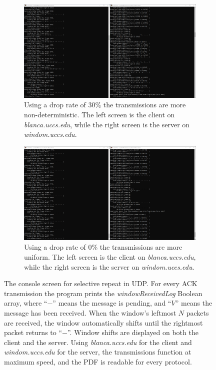 \documentclass[runningheads]{llncs}
\begin{document}
\begin{figure}[htp]
\centering
\begin{subfigure}{1\linewidth}
  \centering
  \includegraphics[width=1\linewidth]{Figures/console_drop_30.png}
  \caption{Using a drop rate of 30\% the transmissions are more non-deterministic. The left screen is the client on \emph{blanca.uccs.edu}, while the right screen is the server on \emph{windom.uccs.edu}.}
  \label{fig:console-udp1}
\end{subfigure}
\begin{subfigure}{1\linewidth}
  \centering
  \includegraphics[width=1\linewidth]{Figures/console_drop_0.png}
  \caption{Using a drop rate of 0\% the transmissions are more uniform. The left screen is the client on \emph{blanca.uccs.edu}, while the right screen is the server on \emph{windom.uccs.edu}.}
  \label{fig:console-udp2}
\end{subfigure}
\caption{The console screen for selective repeat in UDP. For every ACK transmission the program prints the \emph{windowReceivedLog} Boolean array, where ``$-$'' means the message is pending, and ``$V$'' means the message has been received. When the window's leftmost $N$ packets are received, the window automatically shifts until the rightmost packet returns to ``$-$''. Window shifts are displayed on both the client and the server. Using \emph{blanca.uccs.edu} for the client and \emph{windom.uccs.edu} for the server, the transmissions function at maximum speed, and the PDF is readable for every protocol.\label{fig:console}}
\end{figure}
\end{document}
